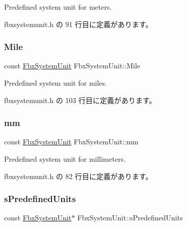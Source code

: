Predefined system unit for meters. 



 fbxsystemunit.\+h の 91 行目に定義があります。

\mbox{\label{class_fbx_system_unit_ae66f3c2d1e92b50cd4ba8bca95a7cb40}} 
\subsubsection{\texorpdfstring{Mile}{Mile}}
{\footnotesize\ttfamily const \hyperlink{class_fbx_system_unit}{Fbx\+System\+Unit} Fbx\+System\+Unit\+::\+Mile\hspace{0.3cm}{\ttfamily [static]}}



Predefined system unit for miles. 



 fbxsystemunit.\+h の 103 行目に定義があります。

\mbox{\label{class_fbx_system_unit_aac172547aa34bdc8d71d6c5668262c25}} 
\subsubsection{\texorpdfstring{mm}{mm}}
{\footnotesize\ttfamily const \hyperlink{class_fbx_system_unit}{Fbx\+System\+Unit} Fbx\+System\+Unit\+::mm\hspace{0.3cm}{\ttfamily [static]}}



Predefined system unit for millimeters. 



 fbxsystemunit.\+h の 82 行目に定義があります。

\mbox{\label{class_fbx_system_unit_a5a63e7dec80be27c252a24739a710505}} 
\subsubsection{\texorpdfstring{s\+Predefined\+Units}{sPredefinedUnits}}
{\footnotesize\ttfamily const \hyperlink{class_fbx_system_unit}{Fbx\+System\+Unit}$\ast$ Fbx\+System\+Unit\+::s\+Predefined\+Units\hspace{0.3cm}{\ttfamily [static]}}



